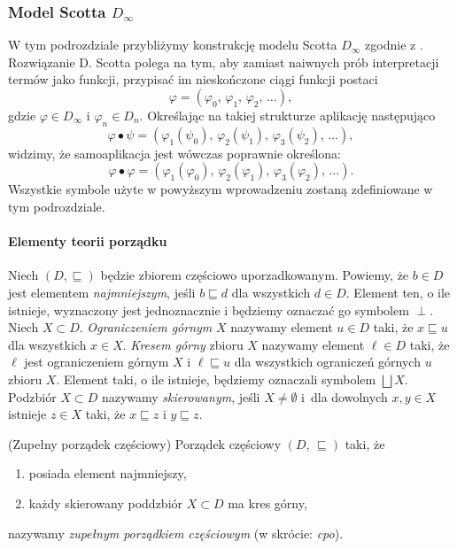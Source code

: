 \subsubsection{Model Scotta \(D_\infty\)}
W tym podrozdziale przybliżymy konstrukcję modelu Scotta \(D_\infty\) zgodnie z \cite[Rozdział 16]{Hindley:2008:LCI:1388400}. Rozwiązanie D. Scotta polega na tym, aby zamiast naiwnych prób interpretacji termów jako funkcji, przypisać im nieskończone ciągi funkcji postaci 
\[
  \varphi = (\varphi_0,\,\varphi_1,\,\varphi_2,\,\dots),
\]
gdzie \(\varphi \in D_\infty\) i \(\varphi_n\in D_n\). Określając na takiej strukturze aplikację następująco
\[
  \varphi\bullet\psi = (\varphi_1(\psi_0),\,\varphi_2(\psi_1),\,\varphi_3(\psi_2),\,\dots),
\]
widzimy, że samoaplikacja jest wówczas poprawnie określona: 
\[
  \varphi\bullet\varphi = (\varphi_1(\varphi_0),\,\varphi_2(\varphi_1),\,\varphi_3(\varphi_2),\,\dots).
\]
Wszystkie symbole użyte w powyższym wprowadzeniu zostaną zdefiniowane w tym podrozdziale.

\paragraph{Elementy teorii porządku} 
Niech \((D,\sqsubseteq)\) będzie zbiorem częściowo uporzadkowanym. Powiemy, że \(b\in D\) jest elementem \emph{najmniejszym}, jeśli \(b\sqsubseteq d\) dla wszystkich \(d\in D\). Element ten, o ile istnieje, wyznaczony jest jednoznacznie i będziemy oznaczać go symbolem \(\perp\). Niech \(X\subset D\). \emph{Ograniczeniem górnym} \(X\) nazywamy element \(u\in D\) taki, że \(x\sqsubseteq u\) dla wszystkich \(x\in X\). \emph{Kresem górny} zbioru \(X\) nazywamy element \(\ell\in D\) taki, że \(\ell\) jest ograniczeniem górnym \(X\) i \(\ell\sqsubseteq u\) dla wszystkich ograniczeń górnych \(u\) zbioru \(X\). Element taki, o ile istnieje, będziemy oznaczali symbolem \(\bigsqcup X\). Podzbiór \(X\subset D\) nazywamy \emph{skierowanym}, jeśli \(X\neq\emptyset\) i~dla dowolnych \(x, y\in X\) istnieje \(z\in X\) taki, że \(x\sqsubseteq z\) i \(y\sqsubseteq z\). 

\begin{definicja}(Zupełny porządek częściowy) %
  Porządek częściowy \({(D,\,\sqsubseteq)}\) taki, że
\begin{enumerate}[label={(\alph*)}, ref={(\alph*)}]
  \setlength\itemsep{0em}
  \item posiada element najmniejszy, 
  \item każdy skierowany poddzbiór \(X\subset D\) ma kres górny,
\end{enumerate}
  nazywamy \emph{zupełnym porządkiem częściowym} (w skrócie: \emph{cpo}).
\end{definicja}

